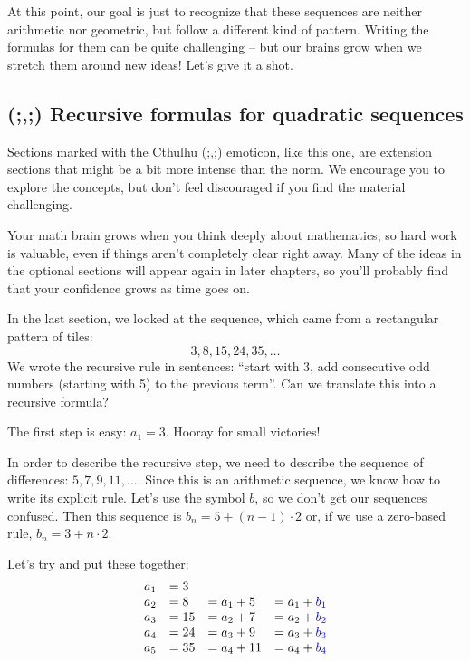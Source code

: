 At this point, our goal is just to recognize that these sequences are neither arithmetic nor geometric, but follow a different kind of pattern. Writing the formulas for them can be quite challenging -- but our brains grow when we stretch them around new ideas! Let's give it a shot.


\subsection{(;,;) Recursive formulas for quadratic sequences}
%
\begin{tcolorbox}[title={Extension sections}]
Sections marked with the Cthulhu (;,;) emoticon, like this one, are extension sections that might be a bit more intense than the norm. We encourage you to explore the concepts, but don't feel discouraged if you find the material challenging.

Your math brain grows when you think deeply about mathematics, so hard work is valuable, even if things aren't completely clear right away. Many of the ideas in the optional sections will appear again in later chapters, so you'll probably find that your confidence grows as time goes on.
\end{tcolorbox}

In the last section, we looked at the sequence, which came from a rectangular pattern of tiles: \[3, 8, 15, 24, 35, \dotsc\]
We wrote the recursive rule in sentences: ``start with 3, add consecutive odd numbers (starting with 5) to the previous term''. Can we translate this into a recursive formula?

The first step is easy: $a_1 = 3$. Hooray for small victories!

In order to describe the recursive step, we need to describe the sequence of differences: $5, 7, 9, 11, \dotsc$. Since this is an arithmetic sequence, we know how to write its explicit rule. Let's use the symbol $b$, so we don't get our sequences confused. Then this sequence is {\color{blue!90!black}$b_n = 5 + (n-1)\cdot 2$} or, if we use a zero-based rule, {\color{blue!90!black}$b_n = 3 + n\cdot 2$}.

Let's try and put these together:
\[\begin{array}{l@{\quad}l@{\quad}l@{\quad}l}
a_1 &= 3\\
a_2 &= 8	&=  a_1 + 5		&= a_1 + {\color{blue!90!black}b_1}\\
a_3 &= 15	&= a_2 + 7		&= a_2 + {\color{blue!90!black}b_2}\\
a_4 &= 24	&= a_3 + 9		&= a_3 + {\color{blue!90!black}b_3}\\
a_5 &= 35	&= a_4 + 11	&= a_4 + {\color{blue!90!black}b_4}
\end{array}\]

